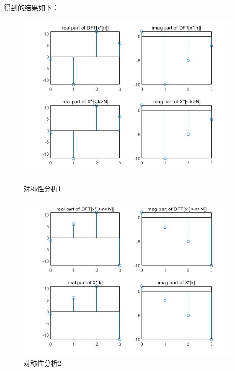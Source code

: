 \documentclass[a4paper,12pt]{article}
\begin{document}
得到的结果如下：
\begin{figure}[h]
    \centering
    \begin{minipage}[b]{0.48\textwidth}
        \centering
        \includegraphics[width=\linewidth]{images/2_Verify/symmetry1.jpg}
        \caption{对称性分析1}
    \end{minipage}
    \hfill
    \begin{minipage}[b]{0.48\textwidth}
        \centering
        \includegraphics[width=\linewidth]{images/2_Verify/symmetry2.jpg}
        \caption{对称性分析2}
    \end{minipage}
\end{figure}
\end{document}
